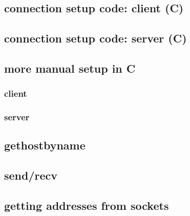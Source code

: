 \subsection{connection setup code: client (C)}
 

\subsection{connection setup code: server (C)}
 

\subsection{more manual setup in C}
\subsubsection{client}
 
\subsubsection{server}
 

\subsection{gethostbyname}
 

\subsection{send/recv}


\subsection{getting addresses from sockets}

